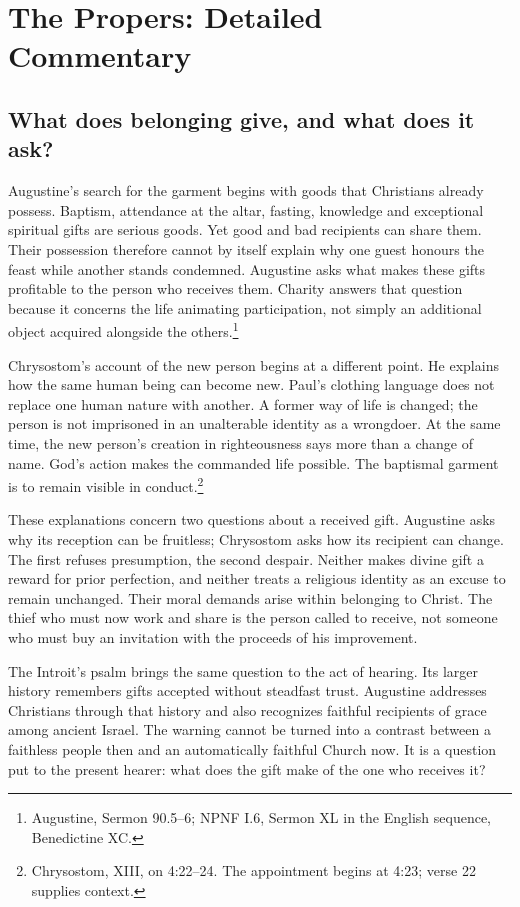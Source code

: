\section{The Propers: Detailed Commentary}

\subsection{What does belonging give, and what does it ask?}

Augustine's search for the garment begins with goods that Christians
already possess. Baptism, attendance at the altar, fasting, knowledge
and exceptional spiritual gifts are serious goods. Yet good and bad
recipients can share them. Their possession therefore cannot by itself
explain why one guest honours the feast while another stands condemned.
Augustine asks what makes these gifts profitable to the person who
receives them. Charity answers that question because it concerns the
life animating participation, not simply an additional object acquired
alongside the others.\footnote{Augustine, Sermon 90.5--6; NPNF I.6,
Sermon XL in the English sequence, Benedictine XC.}

Chrysostom's account of the new person begins at a different point.
He explains how the same human being can become new. Paul's clothing
language does not replace one human nature with another. A former way
of life is changed; the person is not imprisoned in an unalterable
identity as a wrongdoer. At the same time, the new person's creation
in righteousness says more than a change of name. God's action makes
the commanded life possible. The baptismal garment is to remain visible
in conduct.\footnote{Chrysostom,  XIII,
on 4:22--24. The appointment begins at 4:23; verse 22 supplies context.}

These explanations concern two questions about a received gift.
Augustine asks why its reception can be fruitless; Chrysostom asks
how its recipient can change. The first refuses presumption, the second
despair. Neither makes divine gift a reward for prior perfection, and
neither treats a religious identity as an excuse to remain unchanged.
Their moral demands arise within belonging to Christ. The thief who
must now work and share is the person called to receive, not someone
who must buy an invitation with the proceeds of his improvement.

The Introit's psalm brings the same question to the act of hearing.
Its larger history remembers gifts accepted without steadfast trust.
Augustine addresses Christians through that history and also recognizes
faithful recipients of grace among ancient Israel. The warning cannot
be turned into a contrast between a faithless people then and an
automatically faithful Church now. It is a question put to the present
hearer: what does the gift make of the one who receives it?

